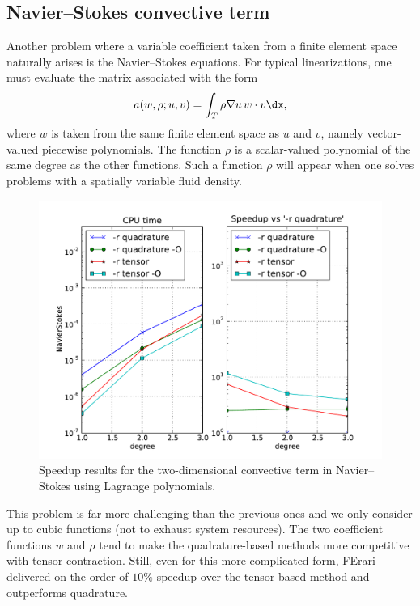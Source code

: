 \subsection{Navier--Stokes convective term}
Another problem where a variable coefficient taken from a finite
element space naturally arises is the Navier--Stokes equations. For
typical linearizations, one must evaluate the matrix associated with
the form
\begin{equation}
  a(w, \rho; u, v) = \int_T \rho \nabla u \, w \cdot v \dx,
\end{equation}
where $w$ is taken from the same finite element space as $u$ and $v$, namely vector-valued piecewise polynomials. The function $\rho$ is a
scalar-valued polynomial of the same degree as the other
functions. Such a function $\rho$ will appear when one solves
problems with a spatially variable fluid density.
\begin{figure}
\bwfig
  \centering
  \includegraphics[width=\largefig]{chapters/kirby-3/pdf/NavierStokes.pdf}
  \caption{Speedup results for the two-dimensional convective term
    in Navier--Stokes using Lagrange polynomials.}
  \label{fig:NavierStokes}
\end{figure}

This problem is far more challenging than the previous ones and we
only consider up to cubic functions (not to exhaust system
resources). The two coefficient functions $ w $ and $ \rho $ tend to
make the quadrature-based methods more competitive with tensor
contraction.  Still, even for this more complicated form, FErari
delivered on the order of $ 10\% $ speedup over the tensor-based
method and outperforms quadrature.

